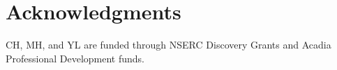 \documentclass[fleqn,10pt]{SelfArx} %
\begin{document}
\section*{Acknowledgments} %
CH, MH, and YL  are funded through NSERC Discovery Grants and Acadia Professional Development funds. 







\end{document}
